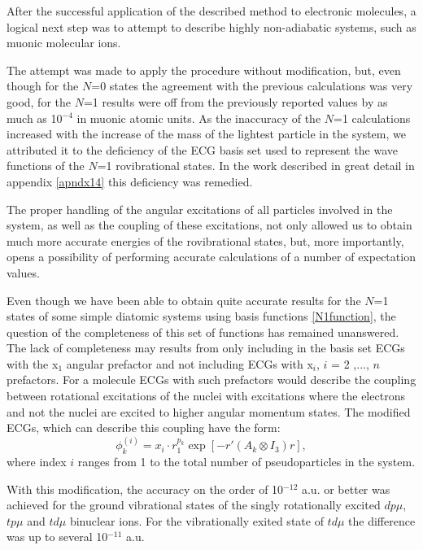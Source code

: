 After the successful application of the described method to electronic molecules,
a logical next step was to attempt to describe highly non-adiabatic systems, such
as muonic molecular ions. 

The attempt was  made to apply the procedure without modification, but, even though 
for the $N$=0 states the agreement with the previous calculations was very good, 
for the $N$=1 results were off from the previously reported values by 
as much as 10$^{-4}$ in muonic atomic units.
As the inaccuracy of the $N$=1 calculations increased with the increase of the 
mass of the lightest particle in the system, we attributed it to the deficiency 
of the ECG basis set used to represent the wave functions of the $N$=1 
rovibrational states. In the work described in great detail in appendix \ref{apndx14} 
this deficiency was remedied.

The proper handling of the angular excitations of all particles involved in the 
system, as well as the coupling of these excitations, not only allowed us to obtain 
much more accurate energies of the rovibrational states, but, more importantly,
opens a possibility of performing accurate calculations of a number of expectation 
values.

Even though we have been able to obtain quite accurate results for the $N$=1 states 
of some simple diatomic systems using basis functions \ref{N1function}, the question 
of the completeness of this set of functions has remained unanswered. The lack of 
completeness may results from only including in the basis set ECGs with the x$_1$ 
angular prefactor and not including ECGs with x$_i$, $i$ = 2 ,$...$, $n$ prefactors. 
For a molecule ECGs with such prefactors would describe the coupling between rotational 
excitations of the nuclei with excitations where the electrons and not the nuclei 
are excited to higher angular momentum states. The modified ECGs, which can describe 
this coupling have the form:
\begin{equation}
\phi_k^{(i)} = x_i \cdot r_1^{p_k} \exp [-r'(A_k \otimes I_3) r],
\label{x_i_finc}
\end{equation}
where index $i$ ranges from 1 to the total number of pseudoparticles in the system.

With this modification, the accuracy on the order of 10$^{-12}$ a.u. or better was achieved
for the ground vibrational states of the singly rotationally excited 
$dp\mu$, $tp\mu$ and $td\mu$ binuclear ions. For the vibrationally exited state 
of $td\mu$ the difference was up to several 10$^{-11}$ a.u.

